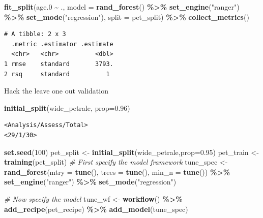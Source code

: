 \documentclass[
]{article}
\newenvironment{Shaded}{\begin{snugshade}}{\end{snugshade}}
\newcommand{\CommentTok}[1]{\textcolor[rgb]{0.56,0.35,0.01}{\textit{#1}}}
\newcommand{\DataTypeTok}[1]{\textcolor[rgb]{0.13,0.29,0.53}{#1}}
\newcommand{\DecValTok}[1]{\textcolor[rgb]{0.00,0.00,0.81}{#1}}
\newcommand{\FloatTok}[1]{\textcolor[rgb]{0.00,0.00,0.81}{#1}}
\newcommand{\KeywordTok}[1]{\textcolor[rgb]{0.13,0.29,0.53}{\textbf{#1}}}
\newcommand{\NormalTok}[1]{#1}
\newcommand{\OperatorTok}[1]{\textcolor[rgb]{0.81,0.36,0.00}{\textbf{#1}}}
\newcommand{\StringTok}[1]{\textcolor[rgb]{0.31,0.60,0.02}{#1}}
\begin{document}
\begin{Shaded}
\begin{Highlighting}[]
\KeywordTok{fit\_split}\NormalTok{(age}\FloatTok{.0} \OperatorTok{\textasciitilde{}}\StringTok{ }\NormalTok{., }
          \DataTypeTok{model =} \KeywordTok{rand\_forest}\NormalTok{() }\OperatorTok{\%>\%}\StringTok{ }
\StringTok{            }\KeywordTok{set\_engine}\NormalTok{(}\StringTok{"ranger"}\NormalTok{) }\OperatorTok{\%>\%}\StringTok{ }
\StringTok{            }\KeywordTok{set\_mode}\NormalTok{(}\StringTok{"regression"}\NormalTok{), }
          \DataTypeTok{split =}\NormalTok{ pet\_split) }\OperatorTok{\%>\%}\StringTok{ }
\StringTok{  }\KeywordTok{collect\_metrics}\NormalTok{()}
\end{Highlighting}
\end{Shaded}

\begin{verbatim}
# A tibble: 2 x 3
  .metric .estimator .estimate
  <chr>   <chr>          <dbl>
1 rmse    standard       3793.
2 rsq     standard          1 
\end{verbatim}

Hack the leave one out validation

\begin{Shaded}
\begin{Highlighting}[]
\KeywordTok{initial\_split}\NormalTok{(wide\_petrale, }\DataTypeTok{prop=}\FloatTok{0.96}\NormalTok{)}
\end{Highlighting}
\end{Shaded}

\begin{verbatim}
<Analysis/Assess/Total>
<29/1/30>
\end{verbatim}

\begin{Shaded}
\begin{Highlighting}[]
\KeywordTok{set.seed}\NormalTok{(}\DecValTok{100}\NormalTok{)}
\NormalTok{pet\_split <{-}}\StringTok{ }\KeywordTok{initial\_split}\NormalTok{(wide\_petrale,}\DataTypeTok{prop=}\FloatTok{0.95}\NormalTok{)}
\NormalTok{pet\_train <{-}}\StringTok{ }\KeywordTok{training}\NormalTok{(pet\_split)}
\CommentTok{\#  First specify the model framework}
\NormalTok{tune\_spec <{-}}\StringTok{ }\KeywordTok{rand\_forest}\NormalTok{(}\DataTypeTok{mtry =} \KeywordTok{tune}\NormalTok{(),}
              \DataTypeTok{trees =} \KeywordTok{tune}\NormalTok{(),}
              \DataTypeTok{min\_n =} \KeywordTok{tune}\NormalTok{()) }\OperatorTok{\%>\%}\StringTok{ }
\StringTok{  }\KeywordTok{set\_engine}\NormalTok{(}\StringTok{"ranger"}\NormalTok{) }\OperatorTok{\%>\%}\StringTok{ }
\StringTok{  }\KeywordTok{set\_mode}\NormalTok{(}\StringTok{"regression"}\NormalTok{) }

\CommentTok{\# Now specify the model}
\NormalTok{tune\_wf <{-}}\StringTok{ }\KeywordTok{workflow}\NormalTok{() }\OperatorTok{\%>\%}\StringTok{ }
\StringTok{  }\KeywordTok{add\_recipe}\NormalTok{(pet\_recipe) }\OperatorTok{\%>\%}\StringTok{ }
\StringTok{  }\KeywordTok{add\_model}\NormalTok{(tune\_spec)}
\end{Highlighting}
\end{Shaded}
\end{document}
